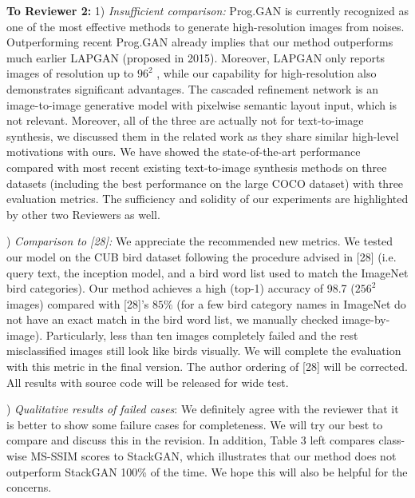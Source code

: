 \documentclass[10pt,twocolumn,letterpaper]{article}
\begin{document}
\noindent
\textbf{To Reviewer 2:} 1) \textit{Insufficient comparison: } Prog.GAN is currently recognized as one of the most effective methods to generate high-resolution images from noises. %
Outperforming recent Prog.GAN already implies that our method outperforms much earlier LAPGAN (proposed in 2015). Moreover, LAPGAN only reports images of resolution up to $96^2$ , while our capability for high-resolution also demonstrates significant advantages. The cascaded refinement network is an image-to-image generative model with pixelwise semantic layout input, which is not relevant. Moreover, all of the three are actually not for text-to-image synthesis,%
we discussed them in the related work as they share similar high-level motivations with ours. We have showed the state-of-the-art performance compared with most recent existing text-to-image synthesis methods on three datasets (including the best performance on the large COCO dataset) with three evaluation metrics.  The sufficiency and solidity of our experiments are highlighted by other two Reviewers as well. 


) \textit{Comparison to [28]: } We appreciate the recommended new metrics. We tested our model on the CUB bird dataset following the procedure advised in [28] (i.e. query text, the inception model, and a bird word list used to match the ImageNet bird categories). Our method achieves a high (top-1) accuracy of 98.7 ($256^2$ images) compared with [28]'s $85\%$ (for a few bird category names in ImageNet do not have an exact match in the bird word list, we manually checked image-by-image). Particularly, less than ten images completely failed and the rest misclassified images still look like birds visually. We will complete the evaluation with this metric in the final version. The author ordering of [28] will be corrected. All results with source code will be released for wide test. 

) \textit{Qualitative results of failed cases}: 
We definitely agree with the reviewer that it is better to show some failure cases for completeness. We will try our best to compare and discuss this in the revision. In addition, Table 3 left compares class-wise MS-SSIM scores to StackGAN, which illustrates that our method does not  outperform StackGAN 100\% of the time. We hope this will also be helpful for the concerns. 
\end{document}
